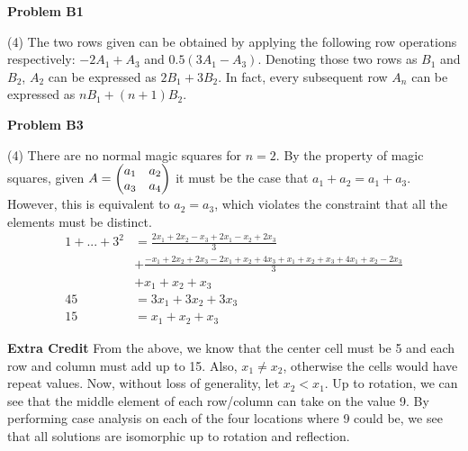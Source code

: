 \documentclass[12pt]{article}
\begin{document}
\vspace {0.25cm} \noindent
{\bf Problem B1}

\noindent(4)
The two rows given can be obtained by applying the following row operations respectively: 
$-2A_1+A_3$ and $0.5(3A_1 - A_3)$. Denoting those two rows as $B_1$ and $B_2$, 
$A_2$ can be expressed as $2B_1 + 3B_2$. In fact, every subsequent row $A_n$ can be 
expressed as $nB_1 + (n+1)B_2$. 

\vspace {0.25cm} \noindent
{\bf Problem B3}

\noindent(4)
There are no normal magic squares for $n=2$. By the property of magic squares, given 
$A = \begin{pmatrix}
  a_1 & a_2\cr a_3 & a_4
\end{pmatrix}$
it must be the case that $a_1 + a_2 = a_1 + a_3$. However, this is equivalent to $a_2 = a_3$, 
which violates the constraint that all the elements must be distinct.
\begin{align*}
  1 + ... + 3^2 &= \frac{2x_1 + 2x_2 - x_3 + 2x_1 - x_2 + 2x_3}{3} \\
  &+ \frac{-x_1 + 2x_2 + 2x_3 - 2x_1 + x_2 + 4x_3 + x_1 + x_2 + x_3 + 4x_1 + x_2 - 2x_3}{3}\\
  &+ x_1 + x_2 + x_3\\
  45 &= 3x_1 + 3 x_2 + 3x_3\\
  15 &= x_1 + x_2 + x_3
\end{align*}

\vspace {0.25cm} \noindent
{\bf Extra Credit}
From the above, we know that the center cell must be 5 and each row and column must add 
up to 15. Also, $x_1 \neq x_2$, otherwise the cells would have repeat values. Now, without 
loss of generality, let $x_2 < x_1$. Up to rotation, we can see that the middle element of each 
row/column can take on the value 9. By performing case analysis on each of the four locations 
where 9 could be, we see that all solutions are isomorphic up to rotation and reflection.
\end{document}
